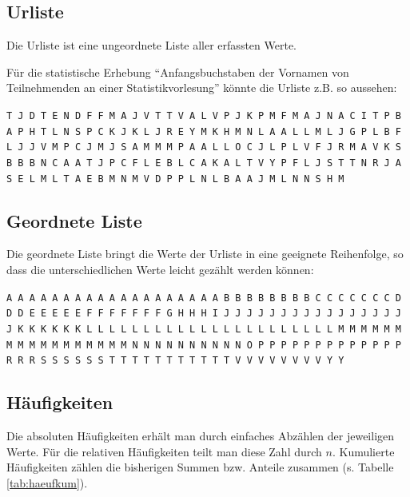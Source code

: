 \documentclass[
  11pt,
  ngerman,
  a4paper,
]{report}
\begin{document}
\hypertarget{urliste}{%
\subsection{Urliste}\label{urliste}}

Die Urliste ist eine ungeordnete Liste aller erfassten Werte.

Für die statistische Erhebung \enquote{Anfangsbuchstaben der Vornamen von Teilnehmenden an einer Statistikvorlesung} könnte die Urliste z.B. so aussehen:

\texttt{T\ J\ D\ T\ E\ N\ D\ F\ F\ M\ A\ J\ V\ T\ T\ V\ A\ L\ V\ P\ J\ K\ P\ M\ F\ M\ A\ J\ N\ A\ C\ I\ T\ P\ B\ A\ P\ H\ T\ L\ N\ S\ P\ C\ K\ J\ K\ L\ J\ R\ E\ Y\ M\ K\ H\ M\ N\ L\ A\ A\ L\ L\ M\ L\ J\ G\ P\ L\ B\ F\ L\ J\ J\ V\ M\ P\ C\ J\ M\ J\ S\ A\ M\ M\ M\ P\ A\ A\ L\ L\ O\ C\ J\ L\ P\ L\ V\ F\ J\ R\ M\ A\ V\ K\ S\ B\ B\ B\ N\ C\ A\ A\ T\ J\ P\ C\ F\ L\ E\ B\ L\ C\ A\ K\ A\ L\ T\ V\ Y\ P\ F\ L\ J\ S\ T\ T\ N\ R\ J\ A\ S\ E\ L\ M\ L\ T\ A\ E\ B\ M\ N\ M\ V\ D\ P\ P\ L\ N\ L\ B\ A\ A\ J\ M\ L\ N\ N\ S\ H\ M}

\hypertarget{geordnete-liste}{%
\subsection{Geordnete Liste}\label{geordnete-liste}}

Die geordnete Liste bringt die Werte der Urliste in eine geeignete Reihenfolge, so dass die unterschiedlichen Werte leicht gezählt werden können:

\texttt{A\ A\ A\ A\ A\ A\ A\ A\ A\ A\ A\ A\ A\ A\ A\ A\ A\ A\ A\ B\ B\ B\ B\ B\ B\ B\ B\ C\ C\ C\ C\ C\ C\ C\ D\ D\ D\ E\ E\ E\ E\ E\ F\ F\ F\ F\ F\ F\ F\ G\ H\ H\ H\ I\ J\ J\ J\ J\ J\ J\ J\ J\ J\ J\ J\ J\ J\ J\ J\ J\ J\ K\ K\ K\ K\ K\ K\ L\ L\ L\ L\ L\ L\ L\ L\ L\ L\ L\ L\ L\ L\ L\ L\ L\ L\ L\ L\ L\ L\ M\ M\ M\ M\ M\ M\ M\ M\ M\ M\ M\ M\ M\ M\ M\ M\ M\ N\ N\ N\ N\ N\ N\ N\ N\ N\ N\ O\ P\ P\ P\ P\ P\ P\ P\ P\ P\ P\ P\ P\ P\ R\ R\ R\ S\ S\ S\ S\ S\ S\ T\ T\ T\ T\ T\ T\ T\ T\ T\ T\ T\ V\ V\ V\ V\ V\ V\ V\ V\ Y\ Y}

\hypertarget{huxe4ufigkeiten}{%
\subsection{Häufigkeiten}\label{huxe4ufigkeiten}}

Die absoluten Häufigkeiten erhält man durch einfaches Abzählen der jeweiligen Werte. Für die relativen Häufigkeiten teilt man diese Zahl durch \(n\). Kumulierte Häufigkeiten zählen die bisherigen Summen bzw. Anteile zusammen (s. Tabelle \ref{tab:haeufkum}).
\end{document}

